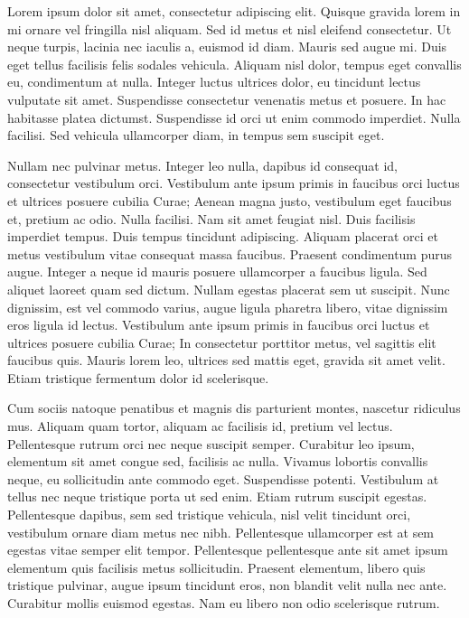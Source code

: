 \begin{acknowledgments}
Lorem ipsum dolor sit amet, consectetur adipiscing elit.
Quisque gravida lorem in mi ornare vel fringilla nisl aliquam.
Sed id metus et nisl eleifend consectetur.
Ut neque turpis, lacinia nec iaculis a, euismod id diam.
Mauris sed augue mi.
Duis eget tellus facilisis felis sodales vehicula.
Aliquam nisl dolor, tempus eget convallis eu, condimentum at nulla.
Integer luctus ultrices dolor, eu tincidunt lectus vulputate sit amet.
Suspendisse consectetur venenatis metus et posuere.
In hac habitasse platea dictumst.
Suspendisse id orci ut enim commodo imperdiet.
Nulla facilisi.
Sed vehicula ullamcorper diam, in tempus sem suscipit eget.

Nullam nec pulvinar metus.
Integer leo nulla, dapibus id consequat id, consectetur vestibulum orci.
Vestibulum ante ipsum primis in faucibus orci luctus et ultrices posuere cubilia Curae; Aenean magna justo, vestibulum eget faucibus et, pretium ac odio.
Nulla facilisi.
Nam sit amet feugiat nisl.
Duis facilisis imperdiet tempus.
Duis tempus tincidunt adipiscing.
Aliquam placerat orci et metus vestibulum vitae consequat massa faucibus.
Praesent condimentum purus augue.
Integer a neque id mauris posuere ullamcorper a faucibus ligula.
Sed aliquet laoreet quam sed dictum.
Nullam egestas placerat sem ut suscipit.
Nunc dignissim, est vel commodo varius, augue ligula pharetra libero, vitae dignissim eros ligula id lectus.
Vestibulum ante ipsum primis in faucibus orci luctus et ultrices posuere cubilia Curae; In consectetur porttitor metus, vel sagittis elit faucibus quis.
Mauris lorem leo, ultrices sed mattis eget, gravida sit amet velit.
Etiam tristique fermentum dolor id scelerisque.

Cum sociis natoque penatibus et magnis dis parturient montes, nascetur ridiculus mus.
Aliquam quam tortor, aliquam ac facilisis id, pretium vel lectus.
Pellentesque rutrum orci nec neque suscipit semper.
Curabitur leo ipsum, elementum sit amet congue sed, facilisis ac nulla.
Vivamus lobortis convallis neque, eu sollicitudin ante commodo eget.
Suspendisse potenti.
Vestibulum at tellus nec neque tristique porta ut sed enim.
Etiam rutrum suscipit egestas.
Pellentesque dapibus, sem sed tristique vehicula, nisl velit tincidunt orci, vestibulum ornare diam metus nec nibh.
Pellentesque ullamcorper est at sem egestas vitae semper elit tempor.
Pellentesque pellentesque ante sit amet ipsum elementum quis facilisis metus sollicitudin.
Praesent elementum, libero quis tristique pulvinar, augue ipsum tincidunt eros, non blandit velit nulla nec ante.
Curabitur mollis euismod egestas.
Nam eu libero non odio scelerisque rutrum.


\end{acknowledgments}
